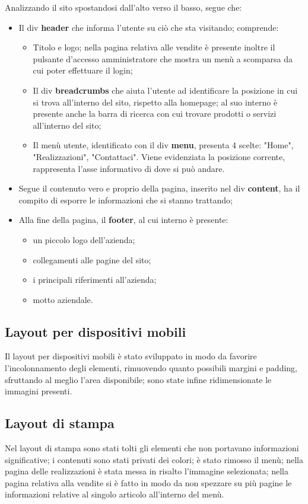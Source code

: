 {{		Analizzando il sito spostandosi dall'alto verso il basso, segue che:
		\begin{itemize}
			\item Il div \textbf{header} che informa l'utente su ciò che sta visitando; comprende:
			\begin{itemize}
				\item Titolo e logo; nella pagina relativa alle vendite è presente inoltre il pulsante d'accesso amministratore che mostra un menù a scomparsa da cui poter effettuare il login;
				\item Il div \textbf{breadcrumbs} che aiuta l'utente ad identificare la posizione in cui si trova all'interno del sito, rispetto alla homepage; al suo interno è presente anche la barra di ricerca con cui trovare prodotti o servizi all'interno del sito;
				\item Il menù utente, identificato con il div \textbf{menu}, presenta 4 scelte: "Home", "Realizzazioni", "Contattaci". Viene evidenziata la posizione corrente, rappresenta l'asse informativo di dove si può andare. 
			\end{itemize}
			\item Segue il contenuto vero e proprio della pagina, inserito nel div \textbf{content}, ha il compito di esporre le informazioni che si stanno trattando;
			\item Alla fine della pagina, il \textbf{footer}, al cui interno è presente:
			\begin{itemize}
				\item un piccolo logo dell'azienda;
				\item collegamenti alle pagine del sito;
				\item i principali riferimenti all'azienda;
				\item motto aziendale.
			\end{itemize}
		\end{itemize}
		}
	\subsection{Layout per dispositivi mobili}{
		Il layout per dispositivi mobili è stato sviluppato in modo da favorire l'incolonnamento degli elementi, rimuovendo quanto possibili margini e padding, sfruttando al meglio l'area disponibile; sono state infine ridimensionate le immagini presenti.
	}
	\subsection{Layout di stampa}{
		Nel layout di stampa sono stati tolti gli elementi che non portavano informazioni significative; i contenuti sono stati privati dei colori; è stato rimosso il menù; nella pagina delle realizzazioni è stata messa in risalto l'immagine selezionata; nella pagina relativa alla vendite si è fatto in modo da non spezzare su più pagine le informazioni relative al singolo articolo all'interno del menù.
	}
}